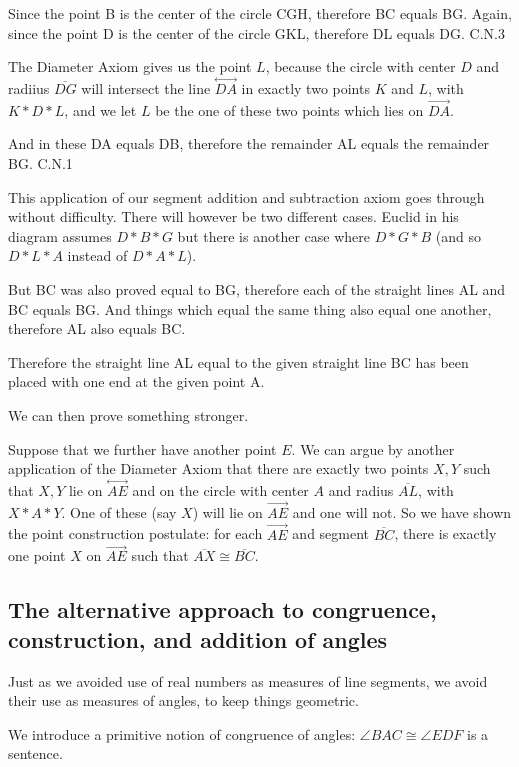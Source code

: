 \documentclass[12pt]{article}
\newcommand\Line[1]{\overset{\leftrightarrow}{#1}}
\begin{document}
\begin{description}
Since the point B is the center of the circle CGH, therefore BC equals BG. Again, since the point D is the center of the circle GKL, therefore DL equals DG.
C.N.3

The Diameter Axiom gives us the point $L$, because the circle with center $D$ and radiius $\overline{DG}$ will intersect the line $\Line{DA}$ in exactly two points $K$ and $L$, with $K*D*L$, and we let $L$
be the one of these two points which lies on $\overrightarrow{DA}$.

And in these DA equals DB, therefore the remainder AL equals the remainder BG.
C.N.1

This application of our segment addition and subtraction axiom goes through without difficulty.  There will however be two different cases.  Euclid in his diagram assumes $D*B*G$ but there is another case
where $D*G*B$ (and so $D*L*A$ instead of $D*A*L$).

But BC was also proved equal to BG, therefore each of the straight lines AL and BC equals BG. And things which equal the same thing also equal one another, therefore AL also equals BC.

Therefore the straight line AL equal to the given straight line BC has been placed with one end at the given point A.

We can then prove something stronger.  

Suppose that we further have another point $E$.  We can argue by another application of the Diameter Axiom that there are exactly two points $X,Y$ such that $X,Y$ lie on $\Line{AE}$ and  on the circle with center $A$ and
radius $\overline{AL}$, with $X*A*Y$.  One of these (say $X$) will lie on $\overrightarrow{AE}$ and one will not.  So we have shown the point construction postulate:  for each $\overrightarrow{AE}$ and segment $\overline{BC}$, there is exactly one point $X$ on $\overrightarrow{AE}$ such that $\overline{AX} \cong \overline{BC}$.

\end{description}

\subsection{The alternative approach to congruence, construction, and addition of angles}

Just as we avoided use of real numbers as measures of line segments, we avoid their use as measures of angles, to keep things geometric.

We introduce a primitive notion of congruence of angles: $\angle BAC \cong \angle EDF$ is a sentence.
\end{document}
